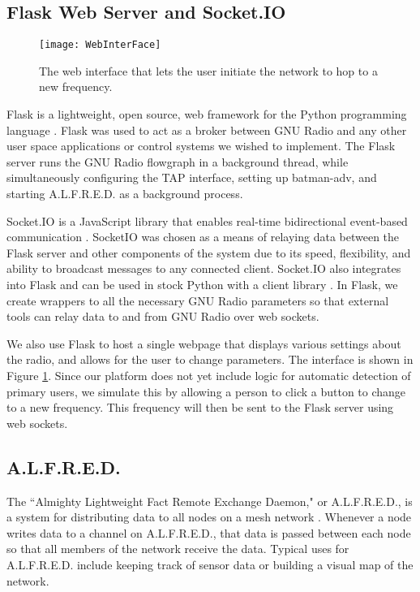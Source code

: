 \subsection{Flask Web Server and Socket.IO}

\begin{figure}
	\centering
	\texttt{[image: WebInterFace]}
	\caption{The web interface that lets the user initiate the network to hop to a new frequency.}
	\label{fig:WebInterface}
\end{figure}

Flask is a lightweight, open source, web framework for the Python programming language \cite{0011}. Flask was used to act as a broker between GNU Radio and any other user space applications or control systems we wished to implement. The Flask server runs the GNU Radio flowgraph in a background thread, while simultaneously configuring the TAP interface, setting up batman-adv, and starting A.L.F.R.E.D. as a background process. 

Socket.IO is a JavaScript library that enables real-time bidirectional event-based communication \cite{0012}.  SocketIO was chosen as a means of relaying data between the Flask server and other components of the system due to its speed, flexibility, and ability to broadcast messages to any connected client. Socket.IO also integrates into Flask \cite{0013} and can be used in stock Python with a client library \cite{0014}. In Flask, we create wrappers to all the necessary GNU Radio parameters so that external tools can relay data to and from GNU Radio over web sockets.  

We also use Flask to host a single webpage that displays various settings about the radio, and allows for the user to change parameters. The interface is shown in Figure \ref{fig:WebInterface}. Since our platform does not yet include logic for automatic detection of primary users, we simulate this by allowing a person to click a button to change to a new frequency. This frequency will then be sent to the Flask server using web sockets.  

\subsection{A.L.F.R.E.D.}

 The ``Almighty Lightweight Fact Remote Exchange Daemon," or A.L.F.R.E.D., is a system for distributing data to all nodes on a mesh network \cite{0015}. Whenever a node writes data to a channel on A.L.F.R.E.D., that data is passed between each node so that all members of the network receive the data. Typical uses for A.L.F.R.E.D. include keeping track of sensor data or building a visual map of the network. 


